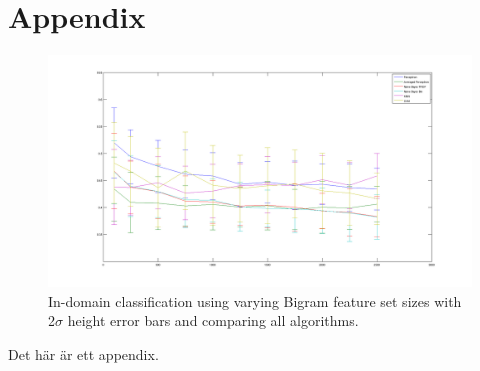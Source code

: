 \chapter{Appendix}
\begin{figure}[H]
\centering
\includegraphics[scale = 0.2]{fig/feature-size100-2500bigram.png}
\caption{In-domain classification using varying Bigram feature set sizes with 2$\sigma$ height error bars and comparing all algorithms.}
\label{fig:trainingsize}
\end{figure} 



Det här är ett appendix.
